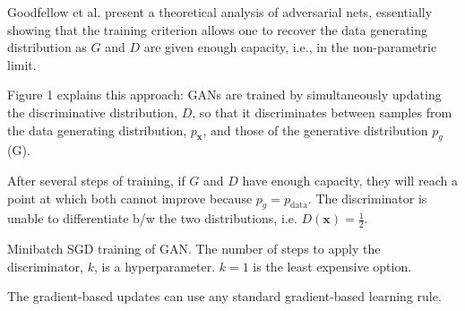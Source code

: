 Goodfellow et al. present a theoretical analysis of adversarial nets, essentially showing that the training criterion allows one to recover the data generating distribution as $G$ and $D$ are given enough capacity, i.e., in the non-parametric limit.

Figure 1 explains this approach: GANs are trained by simultaneously updating the discriminative distribution, $D$, so that it discriminates between samples from the data generating distribution, $p_{\bm{x}}$, and those of the generative distribution $p_g$ (G).

After several steps of training, if $G$ and $D$ have enough capacity, they will reach a point at which both cannot improve because $p_g=p_{\text{data}}$. The discriminator is unable to differentiate b/w the two distributions, i.e. $D(\bm{x})=\frac{1}{2}$.


\begin{algorithm}[H]
\SetAlgoLined
\caption{Minibatch SGD training of GAN. The number of steps to apply the discriminator, $k$, is a hyperparameter. $k=1$ is the least expensive option.}


The gradient-based updates can use any standard gradient-based learning rule.
\end{algorithm}

